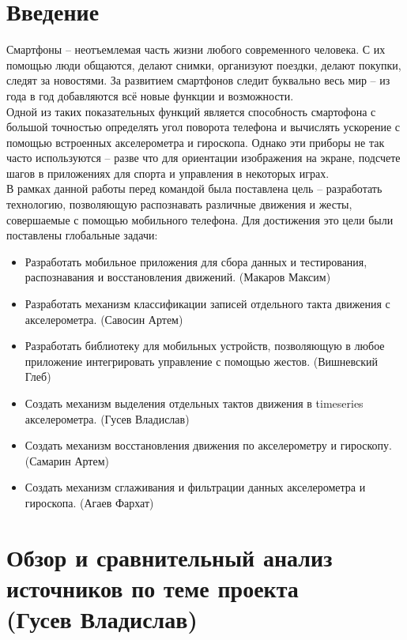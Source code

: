 \section{Введение}

Смартфоны -- неотъемлемая часть жизни любого современного человека. С их помощью люди общаются, делают снимки, организуют поездки, делают покупки, следят за новостями. За развитием смартфонов следит буквально весь мир -- из года в год добавляются всё новые функции и возможности. \\

Одной из таких показательных функций является способность смартофона с большой точностью определять угол поворота телефона и вычислять ускорение с помощью встроенных акселерометра и гироскопа. Однако эти приборы не так часто используются -- разве что для ориентации изображения на экране, подсчете шагов в приложениях для спорта и управления в некоторых играх. \\

В рамках данной работы перед командой была поставлена цель -- разработать технологию, позволяющую распознавать различные движения и жесты, совершаемые с помощью мобильного телефона. Для достижения это цели были поставлены глобальные задачи:

\begin{itemize}
    \item Разработать мобильное приложения для сбора данных и тестирования, распознавания и восстановления движений. (Макаров Максим) 
    \item Разработать механизм классификации записей отдельного такта движения с акселерометра. (Савосин Артем)
    \item Разработать библиотеку для мобильных устройств, позволяющую в любое приложение интегрировать управление с помощью жестов. (Вишневский Глеб)
    \item Создать механизм выделения отдельных тактов движения в timeseries акселерометра. (Гусев Владислав)
    \item Создать механизм восстановления движения по акселерометру и гироскопу. (Самарин Артем)
    \item Создать механизм сглаживания и фильтрации данных акселерометра и гироскопа. (Агаев Фархат)
\end{itemize}

\section{Обзор и сравнительный анализ источников по теме проекта \\ (Гусев Владислав)}

